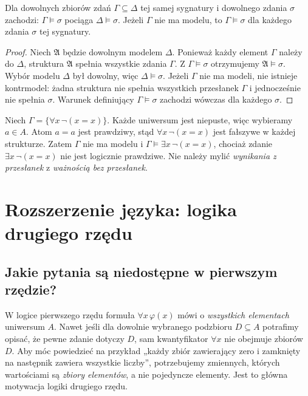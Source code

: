 \begin{twierdzenie}
\label{thm:sem-entailment-monotone-xlv}
Dla dowolnych zbiorów zdań $\Gamma\subseteq\Delta$
tej samej sygnatury i dowolnego zdania $\sigma$ zachodzi:
$\Gamma\models\sigma$ pociąga $\Delta\models\sigma$.
Jeżeli $\Gamma$ nie ma modelu, to $\Gamma\models\sigma$
dla każdego zdania $\sigma$ tej sygnatury.
\end{twierdzenie}
\begin{proof}
Niech $\mathfrak A$ będzie dowolnym modelem $\Delta$.
Ponieważ każdy element $\Gamma$ należy do $\Delta$,
struktura $\mathfrak A$ spełnia wszystkie zdania $\Gamma$.
Z $\Gamma\models\sigma$ otrzymujemy
$\mathfrak A\models\sigma$. Wybór modelu $\Delta$
był dowolny, więc $\Delta\models\sigma$.
Jeżeli $\Gamma$ nie ma modeli, nie istnieje kontrmodel:
żadna struktura nie spełnia wszystkich przesłanek
$\Gamma$ i jednocześnie nie spełnia $\sigma$.
Warunek definiujący $\Gamma\models\sigma$ zachodzi
wówczas dla każdego $\sigma$.
\end{proof}
\begin{przyklad}
Niech $\Gamma=\{\forall x\,\neg(x=x)\}$.
Każde uniwersum jest niepuste, więc wybieramy $a\in A$.
Atom $a=a$ jest prawdziwy, stąd
$\forall x\,\neg(x=x)$ jest fałszywe w każdej strukturze.
Zatem $\Gamma$ nie ma modelu i
$\Gamma\models\exists x\,\neg(x=x)$, chociaż zdanie
$\exists x\,\neg(x=x)$ nie jest logicznie prawdziwe.
Nie należy mylić \emph{wynikania z przesłanek}
z \emph{ważnością bez przesłanek}.
\end{przyklad}

\section{Rozszerzenie języka: logika drugiego rzędu}\label{sec:second-order-introduction}
\subsection{Jakie pytania są niedostępne w pierwszym rzędzie?}
W logice pierwszego rzędu formuła $\forall x\,\varphi(x)$ mówi o
\emph{wszystkich elementach} uniwersum $A$. Nawet jeśli dla dowolnie
wybranego podzbioru $D\subseteq A$ potrafimy opisać, że pewne zdanie
dotyczy $D$, sam kwantyfikator $\forall x$ nie obejmuje zbiorów $D$.
Aby móc powiedzieć na przykład „każdy zbiór zawierający zero
i zamknięty na następnik zawiera wszystkie liczby”, potrzebujemy
zmiennych, których wartościami są \emph{zbiory elementów}, a nie pojedyncze
elementy. Jest to główna motywacja logiki drugiego rzędu.

